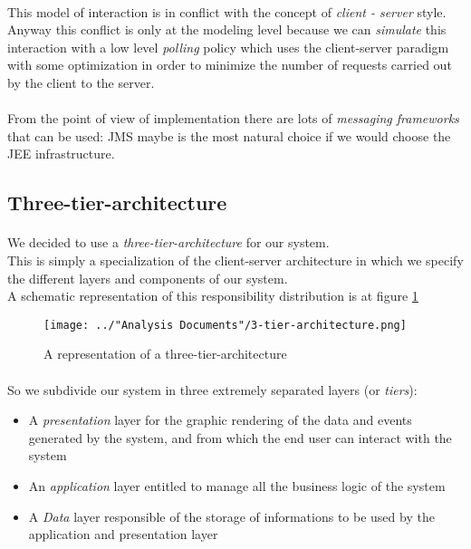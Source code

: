 \paragraph{} This model of interaction is in conflict with the concept of \textit{client - server} style. \\ Anyway this conflict is only at the modeling level because we can \textit{simulate} this interaction with a low level \textit{polling} policy which uses the client-server paradigm with some optimization in order to minimize the number of requests carried out by the client to the server.
\paragraph{} From the point of view of implementation there are lots of \textit{messaging frameworks} that can be used: JMS maybe is the most natural choice if we would choose the JEE infrastructure.
\subsection{Three-tier-architecture}
\paragraph{} We decided to use a \textit{three-tier-architecture} for our system.\\
This is simply a specialization of the client-server architecture in which we specify the different layers and components of our system.\\
A schematic representation of this responsibility distribution is at figure \ref{fig:3-tier-architecture}

\begin{figure}[H]
	\centering
	\texttt{[image: ../"Analysis Documents"/3-tier-architecture.png]}
	\caption{A representation of a three-tier-architecture}
	\label{fig:3-tier-architecture}
\end{figure}
\paragraph{} So we subdivide our system in three extremely separated layers (or \textit{tiers}):
\begin{itemize}
	\item A \textit{presentation} layer for the graphic rendering of the data and events generated by the system, and from which the end user can interact with the system
	\item An \textit{application} layer entitled to manage all the business logic of the system
	\item A \textit{Data} layer responsible of the storage of informations to be used by the application and presentation layer
\end{itemize}
